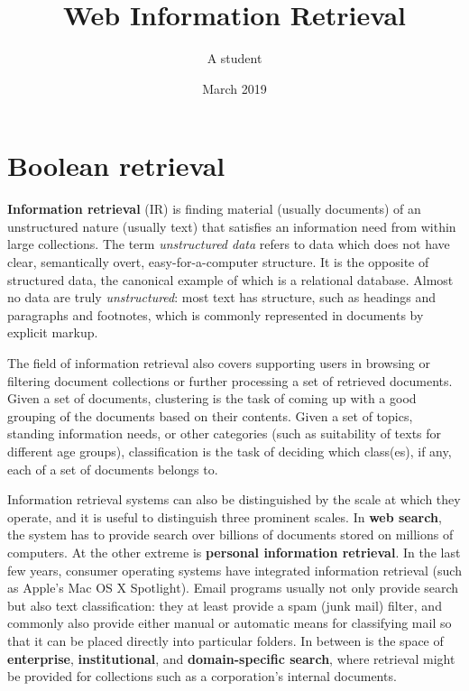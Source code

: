 \documentclass[letterpaper,11pt]{article}
\begin{document}
\title{Web Information Retrieval}
\author{A student}
\date{March 2019}
\maketitle

\section{Boolean retrieval}

\textbf{Information retrieval} (IR) is finding material (usually documents) of an unstructured nature (usually text) that satisfies an information need from within large collections. The term \textit{unstructured data} refers to data which does not have clear, semantically overt, easy-for-a-computer structure. It is the opposite of structured data, the canonical example of which is a relational database. Almost no data are truly \textit{unstructured}: most text has structure, such as headings and paragraphs and footnotes, which is commonly represented in documents by explicit markup. 

The field of information retrieval also covers supporting users in browsing or filtering document collections or further processing a set of retrieved documents. Given a set of documents, clustering is the task of coming up with a good grouping of the documents based on their contents. Given a set of topics, standing information needs, or other categories (such as suitability of texts for different age groups), classification is the task of deciding which class(es), if any, each of a set of documents belongs to.

Information retrieval systems can also be distinguished by the scale at which they operate, and it is useful to distinguish three prominent scales. In \textbf{web search}, the system has to provide search over billions of documents stored on millions of computers. At the other extreme is \textbf{personal information retrieval}. In the last few years, consumer operating systems have integrated information retrieval (such as Apple's Mac OS X Spotlight). Email programs usually not only provide search but also text classification: they at least provide a spam (junk mail) filter, and commonly also provide either manual or automatic means for classifying mail so that it can be placed directly into particular folders. In between is the space of \textbf{enterprise}, \textbf{institutional}, and \textbf{domain-specific search}, where retrieval might be provided for collections such as a corporation's internal documents.
\end{document}
